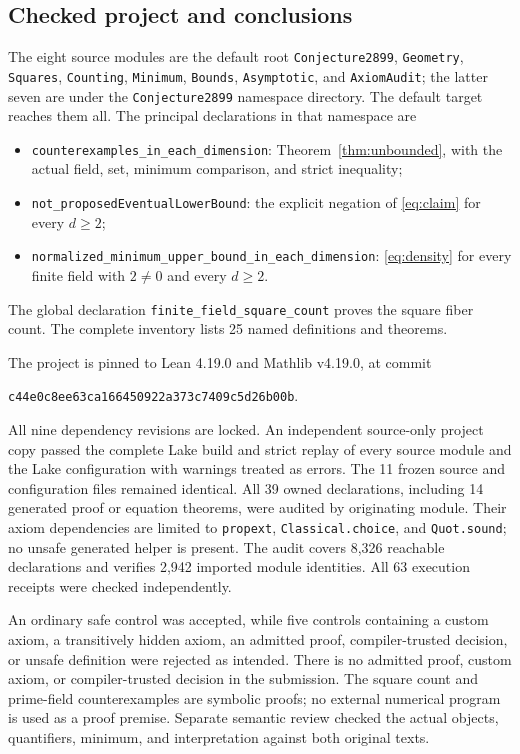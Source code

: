 \documentclass[11pt]{article}
\begin{document}
\subsection*{Checked project and conclusions}
The eight source modules are the default root \texttt{Conjecture2899},
\texttt{Geometry}, \texttt{Squares}, \texttt{Counting}, \texttt{Minimum},
\texttt{Bounds}, \texttt{Asymptotic}, and \texttt{AxiomAudit}; the latter seven
are under the \texttt{Conjecture2899} namespace directory. The default target
reaches them all. The principal declarations in that namespace are
\begin{itemize}
\item \texttt{counterexamples\_in\_each\_dimension}: Theorem~\ref{thm:unbounded},
with the actual field, set, minimum comparison, and strict inequality;
\item \texttt{not\_proposedEventualLowerBound}: the explicit negation of
\eqref{eq:claim} for every $d\geq2$;
\item \texttt{normalized\_minimum\_upper\_bound\_in\_each\_dimension}:
\eqref{eq:density} for every finite field with $2\neq0$ and every $d\geq2$.
\end{itemize}
The global declaration \texttt{finite\_field\_square\_count} proves the square
fiber count. The complete inventory lists 25 named definitions and theorems.

The project is pinned to Lean 4.19.0 and Mathlib v4.19.0, at commit
\begin{center}
\small\texttt{c44e0c8ee63ca166450922a373c7409c5d26b00b}.
\end{center}
All nine dependency revisions are locked. An independent source-only project copy passed the
complete Lake build and strict replay of every source module and the Lake
configuration with warnings treated as errors. The 11 frozen source and
configuration files remained identical. All 39 owned declarations, including
14 generated proof or equation theorems, were audited by originating module.
Their axiom dependencies are limited to \texttt{propext},
\texttt{Classical.choice}, and \texttt{Quot.sound}; no unsafe generated helper
is present. The audit covers 8,326 reachable declarations and verifies 2,942
imported module identities. All 63 execution receipts were checked independently.

An ordinary safe control was accepted, while five controls containing a custom
axiom, a transitively hidden axiom, an admitted proof, compiler-trusted decision,
or unsafe definition were rejected as intended. There is no admitted proof,
custom axiom, or compiler-trusted decision in the submission. The square count
and prime-field counterexamples are symbolic proofs; no external numerical
program is used as a proof premise. Separate semantic review checked the actual
objects, quantifiers, minimum, and interpretation against both original texts.
\end{document}
